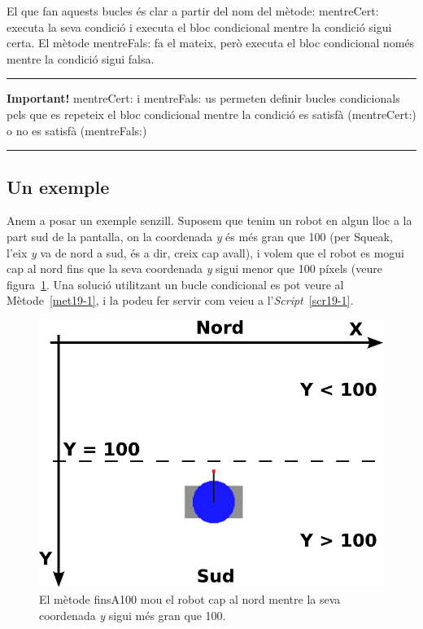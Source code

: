 El que fan aquests bucles és clar a partir del nom del mètode: \textsf{mentreCert:} executa la seva condició i executa el bloc condicional mentre la condició sigui certa. El mètode \textsf{mentreFals:} fa el mateix, però executa el bloc condicional només mentre la condició sigui falsa.

\noindent
\rule{\textwidth}{2pt}
\noindent
\textbf{Important!} \textsf{mentreCert:} i \textsf{mentreFals:} us permeten definir bucles condicionals pels que es repeteix el bloc condicional mentre la condició es satisfà (\textsf{mentreCert:}) o no es satisfà (\textsf{mentreFals:})
\noindent
\rule{\textwidth}{2pt}

\subsection{Un exemple}
Anem a posar un exemple senzill. Suposem que tenim un robot en algun lloc a la part sud de la pantalla, on la coordenada \emph{y} és més gran que 100 (per Squeak, l'eix \emph{y} va de nord a sud, és a dir, creix cap avall), i volem que el robot es mogui cap al nord fins que la seva coordenada \emph{y} sigui menor que 100 píxels (veure figura~\ref{fig1901}. Una solució utilitzant un bucle condicional es pot veure al Mètode~\ref{met19-1}, i la podeu fer servir com veieu a l'\emph{Script}~\ref{scr19-1}. 

\begin{figure}[h!]
\begin{center}
\includegraphics[scale=0.5]{Imatges/figura19-1.pdf}
\end{center}
\caption{El mètode \textsf{\upshape finsA100} mou el robot cap al nord mentre la seva coordenada \emph{y} sigui més gran que 100.}
\label{fig1901}
\end{figure}

